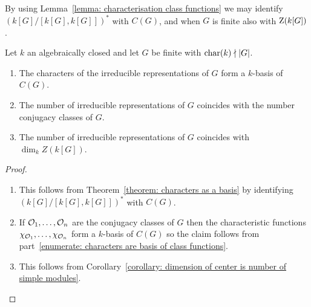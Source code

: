 \begin{fluff}
  By using Lemma~\ref{lemma: characterisation class functions} we may identify $(k[G]/[k[G], k[G]])^*$ with $C(G)$, and when $G$ is finite also with $\operatorname{Z}(k[G])$.
\end{fluff}




\begin{proposition}
  \label{proposition: conjugacy classes and irreducible representations}
  Let $k$ an algebraically closed and let $G$ be finite with $\operatorname{char}(k) \nmid |G|$.
  \begin{enumerate}
    \item
      \label{enumerate: characters are basis of class functions}
     The characters of the irreducible representations of $G$ form a $k$-basis of $C(G)$.
    \item
      \label{enumerate: number of irr rep is number of conjugacy classes}
      The number of irreducible representations of $G$ coincides with the number conjugacy classes of $G$.
    \item
      \label{enumerate: number of irr rep is dim of center}
      The number of irreducible representations of $G$ coincides with $\dim_k Z(k[G])$.
  \end{enumerate}
\end{proposition}


\begin{proof}
  \leavevmode
  \begin{enumerate}
    \item
      This follows from Theorem~\ref{theorem: characters as a basis} by identifying $(k[G]/[k[G], k[G]])^*$ with $C(G)$.
    \item
      If $\mathcal{O}_1, \dotsc, \mathcal{O}_n$ are the conjugacy classes of $G$ then the characteristic functions $\chi_{\mathcal{O}_1}, \dotsc, \chi_{\mathcal{O}_n}$ form a $k$-basis of $C(G)$ so the claim follows from part~\ref*{enumerate: characters are basis of class functions}.
    \item
      This follows from Corollary~\ref{corollary: dimension of center is number of simple modules}.
    \qedhere
  \end{enumerate}
\end{proof}





